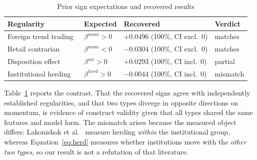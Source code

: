 \begin{table}[t]
  \caption{Prior sign expectations and recovered results}
  \label{tab:construct}
  \small
  \begin{tabular}{@{}>{\raggedright\arraybackslash}p{}
                  >{\raggedright\arraybackslash}p{}
                  >{\raggedright\arraybackslash}p{}
                  >{\raggedright\arraybackslash}p{}@{}}
    \toprule
    Regularity & Expected & Recovered & Verdict \\
    \midrule
    Foreign trend trading~\cite{grinblatt2000investment,choe1999foreign}
      & $\beta^{mom}\!>\!0$ & $+0.0496$ (100\%, CI excl.\ 0) & matches \\
    Retail contrarian~\cite{grinblatt2000investment,kaniel2008individual}
      & $\beta^{mom}\!<\!0$ & $-0.0304$ (100\%, CI excl.\ 0) & matches \\
    Disposition effect~\cite{shefrin1985disposition,odean1998investors}
      & $\beta^{uw}\!>\!0$ & $+0.0293$ (100\%, CI incl.\ 0) & partial \\
    Institutional herding~\cite{lakonishok1992impact}
      & $\beta^{herd}\!>\!0$ & $-0.0044$ (100\%, CI incl.\ 0) & mismatch \\
    \bottomrule
  \end{tabular}
\end{table}

Table~\ref{tab:construct} reports the contrast. That the recovered signs agree
with independently established regularities, and that two types diverge in
opposite directions on momentum, is evidence of construct validity given that
all types shared the same features and model form. The mismatch arises because
the measured object differs: Lakonishok et al.~\cite{lakonishok1992impact}
measure herding \emph{within} the institutional group, whereas
Equation~\eqref{eq:herd} measures whether institutions move with the
\emph{other two types}, so our result is not a refutation of that literature.
